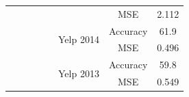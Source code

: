 \documentclass[12pt, a4paper, oneside]{report}
\begin{document}
\begin{tiny}
\begin{latin}
\begin{longtable}{|c|c|c|c|c|c|cc|}
                                                                              &                       &                                   &                                         &                                                                                                        &                                       & \multicolumn{1}{c|}{MSE}                                                                                                           & 2.112  \\ \cline{6-8} 
                                                                              &                       &                                   &                                         &                                                                                                        & \multirow{2}{*}{Yelp 2014}            & \multicolumn{1}{c|}{Accuracy}                                                                                                      & 61.9   \\ \cline{7-8} 
                                                                              &                       &                                   &                                         &                                                                                                        &                                       & \multicolumn{1}{c|}{MSE}                                                                                                           & 0.496  \\ \cline{6-8} 
                                                                              &                       &                                   &                                         &                                                                                                        & \multirow{2}{*}{Yelp 2013}            & \multicolumn{1}{c|}{Accuracy}                                                                                                      & 59.8   \\ \cline{7-8} 
                                                                              &                       &                                   &                                         &                                                                                                        &                                       & \multicolumn{1}{c|}{MSE}                                                                                                           & 0.549  \\ \hline

\end{longtable}
\end{latin}
\end{tiny}
\end{document}
